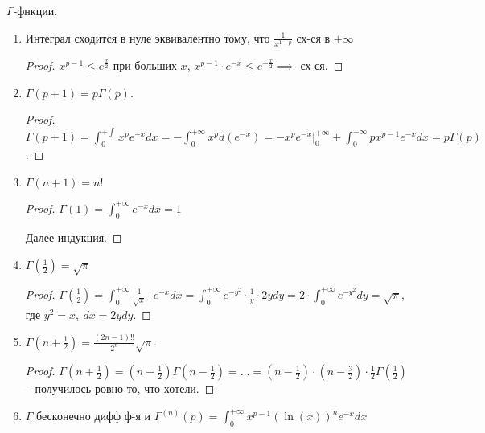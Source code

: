 \begin{properties}
    $\Gamma$-фнкции.

    \begin{enumerate}
        \item {
            Интеграл сходится в нуле эквивалентно тому, что $\frac{1}{x^{1-p}}$ сх-ся в $+\infty$
            
            \begin{proof}
                $x^{p-1} \leq e^{\frac{x}{2}}$ при больших $x$, $x^{p-1} \cdot e^{-x} \leq e^{-\frac{x}{2}} \implies$ сх-ся.
            \end{proof}
        }
        \item {
            $\Gamma(p+1) = p \Gamma(p)$.

            \begin{proof}
                $\Gamma(p+1) = \int_{0}^{+\int} { x^p e^{-x} dx } = - \int_{0}^{+\infty} { x^p d (e^{-x}) } = -x^p e^{-x} |_{0}^{+\infty} + \int_{0}^{+\infty} { p x^{p-1} e^{-x} dx } = p \Gamma(p)$.
            \end{proof}
        }
        \item {
            $\Gamma(n+1) = n!$
            
            \begin{proof}
                $\Gamma(1) = \int_{0}^{+\infty} { e^{-x} dx } = 1$

                Далее индукция.
            \end{proof}
        }
        \item {
            $\Gamma(\frac{1}{2}) = \sqrt{\pi}$

            \begin{proof}
                $\Gamma(\frac{1}{2}) = \int_{0}^{+\infty} { \frac{1}{\sqrt{x}} \cdot e^{-x} dx } = \int_{0}^{+\infty} { e^{-y^2} \cdot \frac{1}{y} \cdot 2y d y } = 2 \cdot \int_{0}^{+\infty} { e^{-y^2} dy } = \sqrt{\pi}$, где $y^2 = x, \ dx = 2y dy$.
            \end{proof}
        }
        \item {
            $\Gamma(n + \frac{1}{2}) = \frac{(2n - 1)!!}{2^n} \sqrt{\pi}$.

            \begin{proof}
                $\Gamma(n + \frac{1}{2}) = (n - \frac{1}{2}) \Gamma (n - \frac{1}{2}) = \dots = (n - \frac{1}{2}) \cdot (n - \frac{3}{2}) \cdot \frac{1}{2} \Gamma(\frac{1}{2})$ -- получилось ровно то, что хотели.
            \end{proof}
        }
        \item {
            $\Gamma$ бесконечно дифф ф-я и $\Gamma^{(n)}(p) = \int_{0}^{+\infty} { x^{p-1} \left( \ln(x) \right)^n e^{-x} dx }$
            
}
\end{enumerate}
\end{properties}
